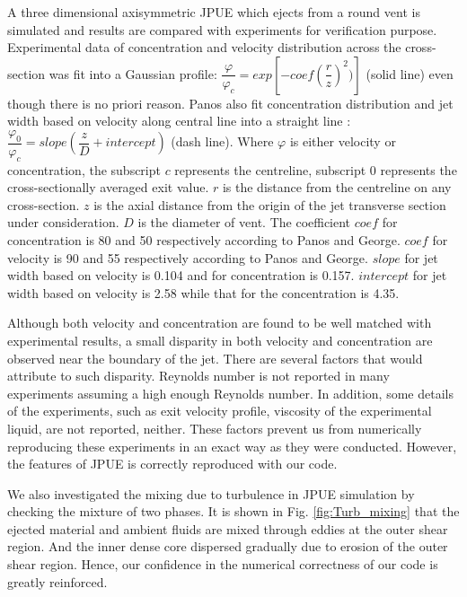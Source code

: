 \documentclass[journal abbreviation, manuscript]{copernicus}
\begin{document}
A three dimensional axisymmetric JPUE which ejects from a round vent is simulated and results are compared with experiments \citep {george1977turbulence, papanicolaou1988investigations} for verification purpose. Experimental data of concentration and velocity distribution across the cross-section was fit into a Gaussian profile: $\dfrac{\varphi}{\varphi_c}=exp[-coef (\dfrac{r}{z})^2)]$ (solid line) even though there is no priori reason. Panos \citep{papanicolaou1988investigations} also fit concentration distribution and jet width based on velocity along central line into a straight line : $\dfrac{\varphi_0}{\varphi_c}=slope (\dfrac{z}{D} + intercept)$ (dash line). Where $\varphi$ is either velocity or concentration, the subscript $c$ represents the centreline, subscript $0$ represents the cross-sectionally averaged exit value. $r$ is the distance from the centreline on any cross-section. $z$ is the axial distance from the origin of the jet transverse section under consideration. $D$ is the diameter of vent. 
The coefficient $coef$ for concentration is 80 and 50 respectively according to Panos and George. $coef$ for velocity is 90 and 55 respectively according to Panos and George. 
$slope$ for jet width based on velocity is 0.104 and for concentration is 0.157. $intercept$ for jet width based on velocity is 2.58 while that for the concentration is 4.35.

Although both velocity and concentration are found to be well matched with experimental results, a small disparity in both velocity and concentration are observed near the boundary of the jet. There are several factors that would attribute to such disparity. Reynolds number is not reported in many experiments assuming a high enough Reynolds number. In addition, some details of the experiments, such as exit velocity profile, viscosity of the experimental liquid, are not reported, neither. These factors prevent us from numerically reproducing these experiments in an exact way as they were conducted. However, the features of JPUE is correctly reproduced with our code.

We also investigated the mixing due to turbulence in JPUE simulation by checking the mixture of two phases. It is shown in Fig. \ref{fig:Turb_mixing} that the ejected material and ambient fluids are mixed through eddies at the outer shear region. And the inner dense core dispersed gradually due to erosion of the outer shear region. Hence, our confidence in the numerical correctness of our code  is greatly reinforced.
\end{document}
